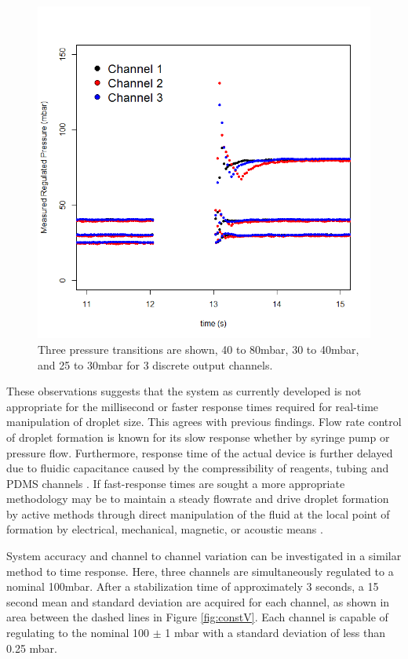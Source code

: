 \begin{figure}[H]
\centering 
\includegraphics[width=01.0\columnwidth]{timeResponse.PNG} 
\caption[PDFC time response]{Three pressure transitions are shown, 40 to 80mbar, 30 to 40mbar, and 25 to 30mbar for 3 discrete output channels. } 
\label{fig:timeResponse} 
\end{figure}

These observations suggests that the system as currently developed is not appropriate for the millisecond or faster response times required for real-time manipulation of droplet size. This agrees with previous findings. Flow rate control of droplet formation is known for its slow response whether by syringe pump or pressure flow. Furthermore, response time of the actual device is further delayed due to fluidic capacitance caused by the compressibility of reagents, tubing and PDMS channels \cite{Churski2013,Stone2004}. If fast-response times are sought a more appropriate methodology may be to maintain a steady flowrate and drive droplet formation by active methods through direct manipulation of the fluid at the local point of formation by electrical, mechanical, magnetic, or acoustic means \cite{Chong2016}.


System accuracy and channel to channel variation can be investigated in a similar method to time response. Here, three channels are simultaneously regulated to a nominal 100mbar. After a stabilization time of approximately 3 seconds, a 15 second mean and standard deviation are acquired for each channel, as shown in area between the dashed lines in Figure \vref{fig:constV}. Each channel is capable of regulating to the nominal 100 $\pm$ 1 mbar with a standard deviation of less than 0.25 mbar.


